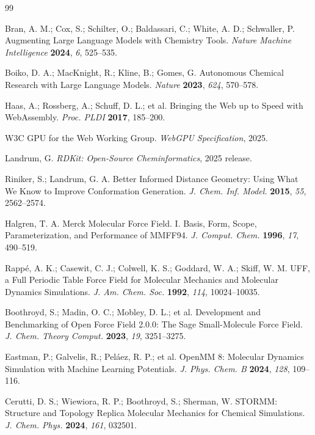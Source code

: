 \documentclass[11pt]{article}
\begin{document}
\begin{thebibliography}{99}

Bran, A. M.; Cox, S.; Schilter, O.; Baldassari, C.; White, A. D.; Schwaller, P.
Augmenting Large Language Models with Chemistry Tools.
\emph{Nature Machine Intelligence} \textbf{2024}, \emph{6}, 525--535.

Boiko, D. A.; MacKnight, R.; Kline, B.; Gomes, G.
Autonomous Chemical Research with Large Language Models.
\emph{Nature} \textbf{2023}, \emph{624}, 570--578.

Haas, A.; Rossberg, A.; Schuff, D. L.; et al.
Bringing the Web up to Speed with WebAssembly.
\emph{Proc. PLDI} \textbf{2017}, 185--200.

W3C GPU for the Web Working Group.
\emph{WebGPU Specification}, 2025.

Landrum, G.
\emph{RDKit: Open-Source Cheminformatics}, 2025 release.

Riniker, S.; Landrum, G. A.
Better Informed Distance Geometry: Using What We Know to Improve Conformation Generation.
\emph{J. Chem. Inf. Model.} \textbf{2015}, \emph{55}, 2562--2574.

Halgren, T. A.
Merck Molecular Force Field. I. Basis, Form, Scope, Parameterization, and Performance of MMFF94.
\emph{J. Comput. Chem.} \textbf{1996}, \emph{17}, 490--519.

Rapp{\'e}, A. K.; Casewit, C. J.; Colwell, K. S.; Goddard, W. A.; Skiff, W. M.
UFF, a Full Periodic Table Force Field for Molecular Mechanics and Molecular Dynamics Simulations.
\emph{J. Am. Chem. Soc.} \textbf{1992}, \emph{114}, 10024--10035.

Boothroyd, S.; Madin, O. C.; Mobley, D. L.; et al.
Development and Benchmarking of Open Force Field 2.0.0: The Sage Small-Molecule Force Field.
\emph{J. Chem. Theory Comput.} \textbf{2023}, \emph{19}, 3251--3275.

Eastman, P.; Galvelis, R.; Pel{\'a}ez, R. P.; et al.
OpenMM 8: Molecular Dynamics Simulation with Machine Learning Potentials.
\emph{J. Phys. Chem. B} \textbf{2024}, \emph{128}, 109--116.

Cerutti, D. S.; Wiewiora, R. P.; Boothroyd, S.; Sherman, W.
STORMM: Structure and Topology Replica Molecular Mechanics for Chemical Simulations.
\emph{J. Chem. Phys.} \textbf{2024}, \emph{161}, 032501.


\end{thebibliography}
\end{document}
